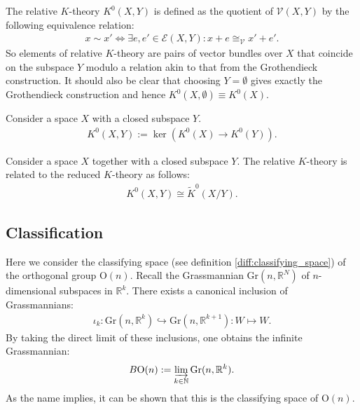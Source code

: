 {{        The relative $K$-theory $K^0(X, Y)$ is defined as the quotient of $\mathscr{V}(X, Y)$ by the following equivalence relation:
        \begin{gather}
            x\sim x' \iff \exists e,e'\in\mathscr{E}(X, Y):x+e\cong_{\mathscr{V}} x'+e'.
        \end{gather}
        So elements of relative $K$-theory are pairs of vector bundles over $X$ that coincide on the subspace $Y$ modulo a relation akin to that from the Grothendieck construction. It should also be clear that choosing $Y=\emptyset$ gives exactly the Grothendieck construction and hence $K^0(X, \emptyset) \equiv K^0(X)$.
    }
    \begin{adefinition}
        Consider a space $X$ with a closed subspace $Y$.
        \begin{gather}
            K^0(X, Y) := \ker\left(K^0(X)\rightarrow K^0(Y)\right).
        \end{gather}
    \end{adefinition}
    \begin{property}[Excision]\label{k:excision}
        Consider a space $X$ together with a closed subspace $Y$. The relative $K$-theory is related to the reduced $K$-theory as follows:
        \begin{gather}
            K^0(X, Y) \cong \widetilde{K}^0(X/Y).
        \end{gather}
    \end{property}

\subsection{Classification}

    \begin{property}
        Here we consider the classifying space (see definition \ref{diff:classifying_space}) of the orthogonal group $\text{O}(n)$. Recall the Grassmannian $\text{Gr}(n, \mathbb{R}^N)$ of $n$-dimensional subspaces in $\mathbb{R}^k$. There exists a canonical inclusion of Grassmannians:
        \begin{gather}
            \iota_k:\text{Gr}(n, \mathbb{R}^k)\hookrightarrow \text{Gr}(n, \mathbb{R}^{k+1}):W\mapsto W.
        \end{gather}
        By taking the direct limit of these inclusions, one obtains the infinite Grassmannian:
        \begin{gather}
            B\text{O}(n) := \varinjlim_{k\in\mathbb{N}}\text{Gr}(n, \mathbb{R}^k).
        \end{gather}
        As the name implies, it can be shown that this is the classifying space of $\text{O}(n)$.


\end{property}}
